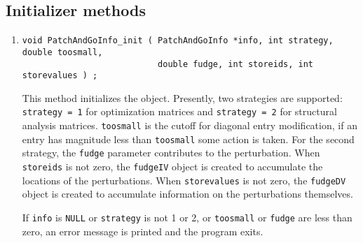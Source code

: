 \subsection{Initializer methods}
\label{subsection:PatchAndGoInfo:proto:initializers}
\par
\begin{enumerate}
\item
\begin{verbatim}
void PatchAndGoInfo_init ( PatchAndGoInfo *info, int strategy, double toosmall, 
                           double fudge, int storeids, int storevalues ) ;
\end{verbatim}
This method initializes the object.
Presently, two strategies are supported: 
{\tt strategy = 1} for optimization matrices
and
{\tt strategy = 2} for structural analysis matrices.
{\tt toosmall} is the cutoff for diagonal entry modification, if an
entry has magnitude less than {\tt toosmall} some action is taken.
For the second strategy, the {\tt fudge} parameter contributes
to the perturbation.
When {\tt storeids} is not zero, 
the {\tt fudgeIV} object is created to accumulate the locations of
the perturbations.
When {\tt storevalues} is not zero, 
the {\tt fudgeDV} object is created to accumulate information on
the perturbations themselves.
\par {}
If {\tt info} is {\tt NULL} 
or {\tt strategy} is not 1 or 2,
or {\tt toosmall} or {\tt fudge} are less than zero,
an error message is printed and the program exits.
\end{enumerate}
